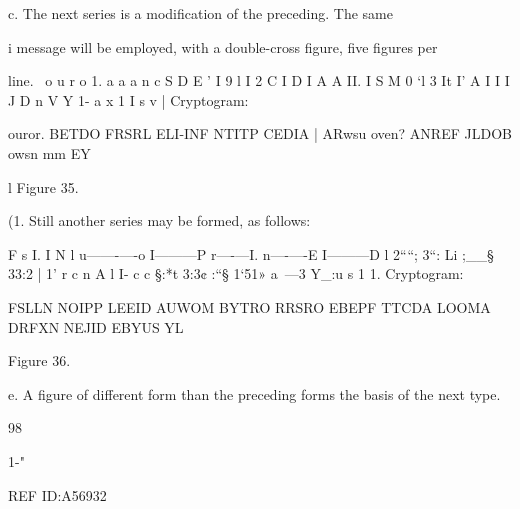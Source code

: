 {c. The next series is a modiﬁcation of the preceding. The same

i message will be employed, with a double-cross ﬁgure, ﬁve ﬁgures per

 

 

 

 

 

 

 

 

 

 

 

 

 

 

 

 

 

 

 

 

 

 

line.
\ o u r o 1. a a a n c
S D E ' I 9
l I 2 C I D I A
A II. I S M 0 ‘l 3 It I’
A I I I J
D n V
Y 1-
a x 1 I s v
| Cryptogram:

ouror. BETDO FRSRL ELI-INF NTITP CEDIA
| ARwsu oven? ANREF JLDOB owsn mm
EY

l Figure 35.

(1. Still another series may be formed, as follows:

 

 

 

 

 

 

 

 

 

F s I. I N
l u——-—-o I———P r—-—I. n—-—-E I———D
l 2““; 3“: Li ;__§ 33:2
| 1' r c n A
l I- c c
§:*t 3:3¢ :“§
1‘51» a~—3 Y_:u
s 1 1.
Cryptogram:

FSLLN NOIPP LEEID AUWOM BYTRO RRSRO
EBEPF TTCDA LOOMA DRFXN NEJID EBYUS
YL

Figure 36.

e. A ﬁgure of different form than the preceding forms the basis of
the next type.

 

98

1-"

REF ID:A56932

}
